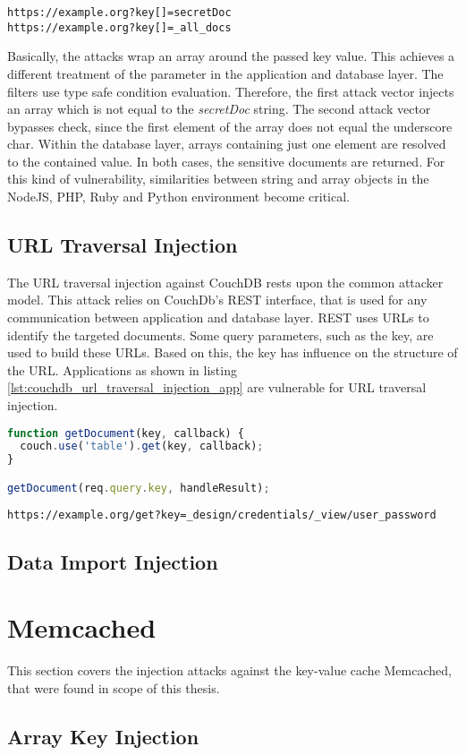 \begin{lstlisting}[caption={Attack vectors on CouchDB for array key injection via HTTP GET}, label={lst:couch_array_key_injection_attack}]
https://example.org?key[]=secretDoc
https://example.org?key[]=_all_docs
\end{lstlisting}

Basically, the attacks wrap an array around the passed key value. This achieves a different treatment of the parameter in the application and database layer. The filters use type safe condition evaluation. Therefore, the first attack vector injects an array which is not equal to the \emph{secretDoc} string. The second attack vector bypasses check, since the first element of the array does not equal the underscore char. Within the database layer, arrays containing just one element are resolved to the contained value. In both cases, the sensitive documents are returned. For this kind of vulnerability, similarities between string and array objects in the NodeJS, PHP, Ruby and Python environment become critical.   

\subsection{URL Traversal Injection}
The URL traversal injection against CouchDB rests upon the common attacker model. This attack relies on CouchDb's REST interface, that is used for any communication between application and database layer. REST uses URLs to identify the targeted documents. Some query parameters, such as the key, are used to build these URLs. Based on this, the key has influence on the structure of the URL. Applications as shown in listing \ref{lst:couchdb_url_traversal_injection_app} are vulnerable for URL traversal injection. \\

\begin{lstlisting}[caption={Vulnerable NodeJS example for URL traversal injection on CouchDB}, label={lst:couchdb_url_traversal_injection_app}, language=JavaScript]
function getDocument(key, callback) {
  couch.use('table').get(key, callback);
}

getDocument(req.query.key, handleResult);
\end{lstlisting}

\begin{lstlisting}[caption={Attack vectors on CouchDB for URL traversal injection via HTTP GET}, label={lst:PHPArrayInjection}]
https://example.org/get?key=_design/credentials/_view/user_password
\end{lstlisting}


\subsection{Data Import Injection}

\section{Memcached}
This section covers the injection attacks against the key-value cache Memcached, that were found in scope of this thesis.
\subsection{Array Key Injection}